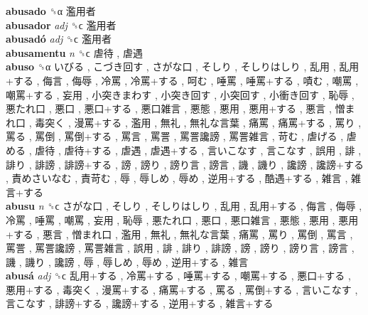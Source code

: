 \textbf{abusado} ␝α   濫用者   \\
\textbf{abusador} \emph{adj}  ␝ϲ   濫用者   \\
\textbf{abusadó} \emph{adj}  ␝ϲ   濫用者   \\
\textbf{abusamentu} \emph{n}  ␝ϲ   虐待 ,  虐遇   \\
\textbf{abuso} ␝α   いびる ,  こづき回す ,  さがな口 ,  そしり ,  そしりはしり ,  乱用 ,  乱用+する ,  侮言 ,  侮辱 ,  冷罵 ,  冷罵+する ,  呵む ,  唾罵 ,  唾罵+する ,  嘖む ,  嘲罵 ,  嘲罵+する ,  妄用 ,  小突きまわす ,  小突き回す ,  小突回す ,  小衝き回す ,  恥辱 ,  悪たれ口 ,  悪口 ,  悪口+する ,  悪口雑言 ,  悪態 ,  悪用 ,  悪用+する ,  悪言 ,  憎まれ口 ,  毒突く ,  漫罵+する ,  濫用 ,  無礼 ,  無礼な言葉 ,  痛罵 ,  痛罵+する ,  罵り ,  罵る ,  罵倒 ,  罵倒+する ,  罵言 ,  罵詈 ,  罵詈讒謗 ,  罵詈雑言 ,  苛む ,  虐げる ,  虐める ,  虐待 ,  虐待+する ,  虐遇 ,  虐遇+する ,  言いこなす ,  言こなす ,  誤用 ,  誹 ,  誹り ,  誹謗 ,  誹謗+する ,  謗 ,  謗り ,  謗り言 ,  謗言 ,  譏 ,  譏り ,  讒謗 ,  讒謗+する ,  責めさいなむ ,  責苛む ,  辱 ,  辱しめ ,  辱め ,  逆用+する ,  酷遇+する ,  雑言 ,  雑言+する   \\
\textbf{abusu} \emph{n}  ␝ϲ   さがな口 ,  そしり ,  そしりはしり ,  乱用 ,  乱用+する ,  侮言 ,  侮辱 ,  冷罵 ,  唾罵 ,  嘲罵 ,  妄用 ,  恥辱 ,  悪たれ口 ,  悪口 ,  悪口雑言 ,  悪態 ,  悪用 ,  悪用+する ,  悪言 ,  憎まれ口 ,  濫用 ,  無礼 ,  無礼な言葉 ,  痛罵 ,  罵り ,  罵倒 ,  罵言 ,  罵詈 ,  罵詈讒謗 ,  罵詈雑言 ,  誤用 ,  誹 ,  誹り ,  誹謗 ,  謗 ,  謗り ,  謗り言 ,  謗言 ,  譏 ,  譏り ,  讒謗 ,  辱 ,  辱しめ ,  辱め ,  逆用+する ,  雑言   \\
\textbf{abusá} \emph{adj}  ␝ϲ   乱用+する ,  冷罵+する ,  唾罵+する ,  嘲罵+する ,  悪口+する ,  悪用+する ,  毒突く ,  漫罵+する ,  痛罵+する ,  罵る ,  罵倒+する ,  言いこなす ,  言こなす ,  誹謗+する ,  讒謗+する ,  逆用+する ,  雑言+する   \\
